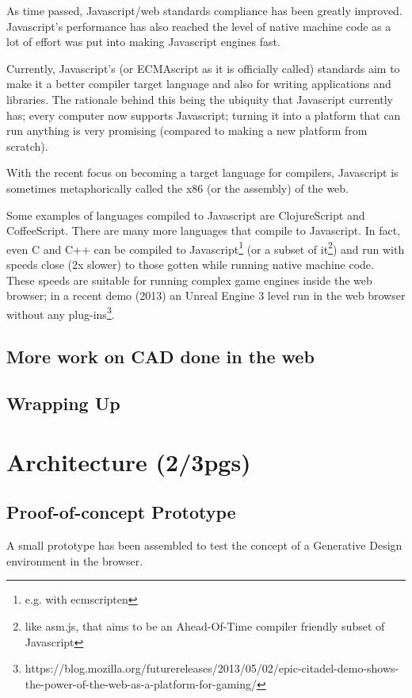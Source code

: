 \documentclass{./llncs2e/llncs}
\begin{document}
	As time passed, Javascript/web standards compliance has been greatly improved. Javascript's performance has also reached the level of native machine code as a lot of effort was put into making Javascript engines fast.

	Currently, Javascript's (or ECMAscript as it is officially called) standards aim to make it a better compiler target language and also for writing applications and libraries. The rationale behind this being the ubiquity that Javascript currently has; every computer now supports Javascript; turning it into a platform that can run anything is very promising (compared to making a new platform from scratch).

	With the recent focus on becoming a target language for compilers, Javascript is sometimes metaphorically called the x86 (or the assembly) of the web.

	Some examples of languages compiled to Javascript are ClojureScript and CoffeeScript. There are many more languages that compile to Javascript. In fact, even C and C++ can be compiled to Javascript\footnote{e.g. with ecmscripten} (or a subset of it\footnote{like asm.js, that aims to be an Ahead-Of-Time compiler friendly subset of Javascript}) and run with speeds close (2x slower) to those gotten while running native machine code. These speeds are suitable for running complex game engines inside the web browser; in a recent demo (2013) an Unreal Engine 3 level run in the web browser without any plug-ins\footnote{https://blog.mozilla.org/futurereleases/2013/05/02/epic-citadel-demo-shows-the-power-of-the-web-as-a-platform-for-gaming/}.


\subsection{More work on CAD done in the web}


\subsection{Wrapping Up}

\section{Architecture (2/3pgs)}
\subsection{Proof-of-concept Prototype}
	A small prototype has been assembled to test the concept of a Generative Design environment in the browser.
\end{document}
